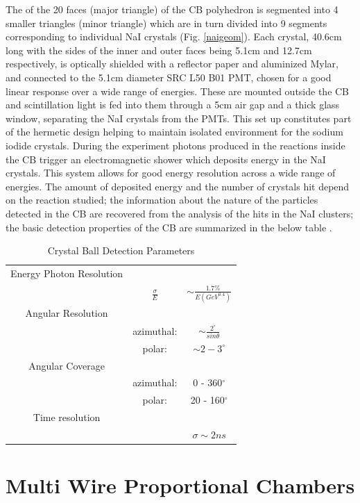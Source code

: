 \indent The of the 20 faces (major triangle) of the CB polyhedron is segmented into 4 smaller triangles (minor triangle)  which  are in turn divided into 9 segments corresponding to individual NaI crystals (Fig. \ref{naigeom}). Each crystal, 40.6cm long with the sides of the inner and outer faces being 5.1cm and 12.7cm respectively, is optically shielded with a reflector paper and aluminized Mylar, and connected to the 5.1cm diameter SRC L50 B01 PMT, chosen for a good linear response over a wide range of energies. These are mounted outside the CB and scintillation light is fed into them through a 5cm air gap and a thick glass window, separating the NaI crystals from the PMTs. This set up constitutes part of the hermetic design helping to maintain isolated environment for the sodium iodide crystals. During the experiment photons produced in the reactions inside the CB trigger an electromagnetic shower which deposits energy in the NaI crystals. This system allows for good energy resolution across a wide range of energies. The amount of deposited energy and the number of crystals hit depend on the reaction studied; the  information  about  the  nature  of  the  particles  detected  in  the  CB  are recovered from the analysis of the hits in the NaI clusters; the basic detection properties  of  the  CB  are  summarized  in  the  below  table \cite {starostin}.
 
\begin{table}[ht]
\caption{Crystal Ball Detection Parameters}
\centering
\begin{tabular}{c c c}
\hline\hline
Energy Photon Resolution & &  \\
 & $\frac{\sigma}{E}$ & $\sim \frac{1.7\%}{E(GeV^{0.4})}$ \\
\hline
Angular Resolution & & \\
 & azimuthal: & $\sim \frac{2^{\circ}}{sin\theta}$ \\
 & polar: & $\sim 2-3^{\circ}$ \\
\hline
Angular Coverage & & \\
 & azimuthal: & 0 - 360$^{\circ}$ \\
 & polar: & 20 - 160$^{\circ}$ \\
\hline
Time resolution & & \\
 & & $\sigma \sim 2ns$ \\
\hline\hline
\end{tabular}
\label{table_cbparam}
\end{table} 
 

\section{Multi Wire Proportional Chambers}

